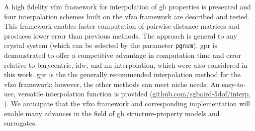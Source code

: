 \documentclass[preprint,12pt]{elsarticle}
\begin{document}
A high fidelity \gls{vfzo} framework for interpolation of \gls{gb} properties is presented and four interpolation schemes built on the \gls{vfzo} framework are described and tested. This framework enables faster computation of pairwise distance matrices and produces lower error than previous methods.
The approach is general to any crystal system (which can be selected by the parameter \texttt{pgnum}). \Gls{gpr} is demonstrated to offer a competitive advantage in computation time and error relative to barycentric, \gls{idw}, and \gls{nn} interpolation, which were also considered in this work. \Gls{gpr} is the the generally recommended interpolation method for the \gls{vfzo} framework; however, the other methods can meet niche needs. An easy-to-use, versatile interpolation function is provided (\url{github.com/sgbaird-5dof/interp}, \cite{bairdFiveDegreeofFreedom5DOF2020}). We anticipate that the \gls{vfzo} framework and corresponding implementation will enable many advances in the field of \gls{gb} structure-property models and surrogates.
    
\end{document}
